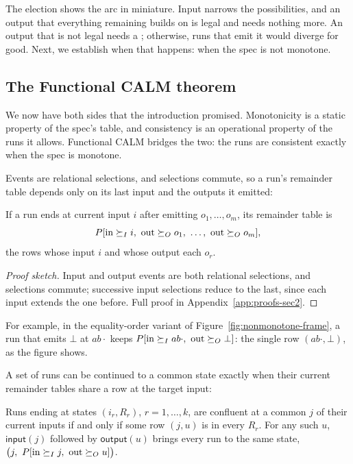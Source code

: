 The election shows the arc in miniature.  Input narrows the possibilities, and
an output that everything remaining builds on is legal and needs nothing more.
An output that is not legal needs a \commitment; otherwise, runs that emit it
would diverge for good.  Next, we establish when that happens: when the spec is
not monotone.

\subsection{The Functional CALM theorem}
\label{sec:functional-calm-theorem}

We now have both sides that the introduction promised.  Monotonicity is a
static property of the spec's table, and consistency is an operational property
of the runs it allows.  Functional CALM bridges the two: the runs are
consistent exactly when the spec is monotone.

Events are relational
selections, and selections commute, so a run's remainder table depends only on
its last input and the outputs it emitted:

\begin{lemma}
\label{lem:run-residual}
If a run ends at current input $i$ after emitting
$o_1,\ldots,o_m$, its remainder table is
\begin{equation}
  P[\mathrm{in}\succeq_I i,\ \mathrm{out}\succeq_O o_1,\ \ldots,\
    \mathrm{out}\succeq_O o_m],
  \label{eq:run-residual}
\end{equation}
the rows whose input \inrel $i$ and whose output \outrel each $o_r$.
\end{lemma}

\begin{proof}[Proof sketch]
Input and output events are both relational selections, and selections
commute; successive input selections reduce to the last, since each input
extends the one before.  Full proof in Appendix~\ref{app:proofs-sec2}.
\end{proof}

For example, in the equality-order variant of
Figure~\ref{fig:nonmonotone-frame}, a run that emits $\bot$ at $ab\cdot$ keeps
$P[\mathrm{in}\InputGe ab\cdot,\ \mathrm{out}\OutputGe\bot]$: the single row
$(ab\cdot,\bot)$, as the figure shows.

A set of runs can be continued to a common state exactly when their
current remainder tables share a row at the target input:

\begin{proposition}
\label{prop:confluence}
Runs ending at states $(i_r,R_r)$, $r=1,\ldots,k$, are confluent at a common
\indesc $j$ of their current inputs if and only if some row $(j,u)$ is in every
$R_r$.  For any such $u$, $\mathsf{input}(j)$ followed by $\mathsf{output}(u)$
brings every run to the same state,
$\bigl(j,\ P[\mathrm{in}\InputGe j,\ \mathrm{out}\OutputGe u]\bigr)$.
\end{proposition}

